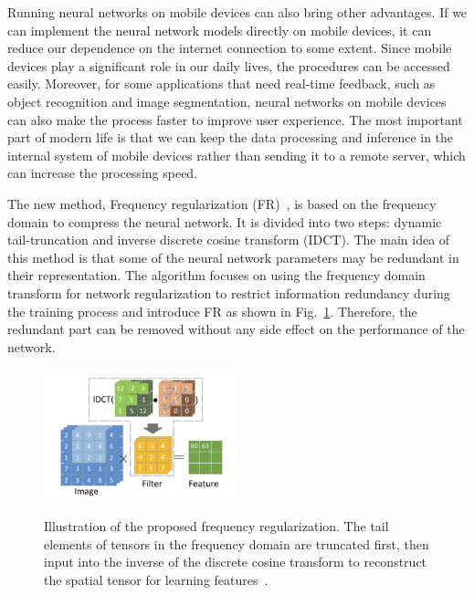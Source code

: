 \documentclass{article}
\begin{document}

Running neural networks on mobile devices can also bring other advantages. If we can implement the neural network models directly on mobile devices, it can reduce our dependence on the internet connection to some extent. Since mobile devices play a significant role in our daily lives, the procedures can be accessed easily. Moreover, for some applications that need real-time feedback, such as object recognition and image segmentation, neural networks on mobile devices can also make the process faster to improve user experience. The most important part of modern life is that we can keep the data processing and inference in the internal system of mobile devices rather than sending it to a remote server, which can increase the processing speed.

The new method, Frequency regularization (FR)~\cite{zhao2023frequency}, is based on the frequency domain to compress the neural network. It is divided into two steps: dynamic tail-truncation and inverse discrete cosine transform (IDCT). The main idea of this method is that some of the neural network parameters may be redundant in their representation. The algorithm focuses on using the frequency domain transform for network regularization to restrict information redundancy during the training process and introduce FR as shown in Fig.~\ref{idct}. Therefore, the redundant part can be removed without any side effect on the performance of the network.

\begin{figure}
	\vspace{-15pt}    %
	\includegraphics[width=0.5\textwidth]{figure/idct.png}\\
	\vspace{-15pt}    %
	\caption{Illustration of the proposed frequency regularization. The tail elements of tensors in the frequency domain are truncated first, then input into the inverse of the discrete cosine transform to reconstruct the spatial tensor for learning features~\cite{zhao2023frequency}.}
	\label{idct}
	\vspace{-15pt}    %
\end{figure}
\end{document}
